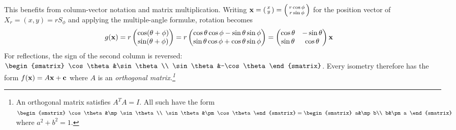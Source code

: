 This benefits from column-vector notation and matrix multiplication. Writing ${\mathbf{x}}=\smash{\left(\begin{smallmatrix}x\\y\end{smallmatrix}\right) =\left(\begin{smallmatrix}r\cos\phi\\r\sin\phi\end{smallmatrix}\right)}$ for the position vector of $X_r=(x,y)=rS_\phi$ and applying the multiple-angle formulæ, rotation becomes
\begin{align*}
	g({\mathbf{x}})&= r\begin{pmatrix}\cos(\theta+\phi)\\\sin(\theta+\phi)\end{pmatrix} =r\begin{pmatrix}\cos\theta\cos\phi-\sin\theta\sin\phi\\\sin\theta\cos\phi+\cos\theta\sin\phi\end{pmatrix} =
	\begin{pmatrix}
		\cos\theta&-\sin\theta\\
		\sin\theta&\cos\theta
	\end{pmatrix}{\mathbf{x}}
\end{align*}
For reflections, the sign of the second column is reversed:
$\begin{smatrix}
	\cos\theta&\sin\theta\\
	\sin\theta&-\cos\theta
\end{smatrix}$.
Every isometry therefore has the form $f({\mathbf{x}})=A{\mathbf{x}}+{\mathbf{c}}$ where $A$ is an \emph{orthogonal matrix.\footnote{An orthogonal matrix satisfies $A^TA=I$. All such have the form 
$\begin{smatrix}
	\cos\theta&\mp\sin\theta\\
	\sin\theta&\pm\cos\theta
\end{smatrix}
=
\begin{smatrix}
	a&\mp b\\
	b&\pm a
\end{smatrix}$
where $a^2+b^2=1$.}}


